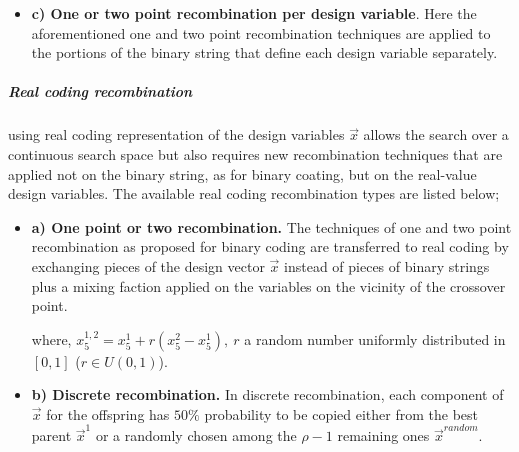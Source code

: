 \begin{itemize}
\item[]{\bf c) One or two point recombination per design variable}. Here the aforementioned one and two point recombination techniques are applied to the portions of the binary string that define each design variable separately.  
\end{itemize}
  

\subparagraph{Real coding recombination} using real coding representation of the design variables $\vec{x}$ allows the search over a continuous search space but also requires new recombination techniques that are applied not on the binary string, as for binary coating, but on the real-value design variables. The available real coding recombination types are listed below;  

\begin{itemize}
\item[]{\bf a) One point or two recombination.} The techniques of one and two point recombination as proposed for binary coding are transferred to real coding by exchanging  pieces of the design vector $\vec{x}$ instead of pieces of binary strings plus a mixing faction applied on the variables on the vicinity of the crossover point.

\begin{figure}[h!]
\begin{minipage}[b]{1.0\linewidth}
 \centering
\end{minipage}
\label{onepX}
\end{figure}
where, $x_5^{1,2}=x_5^{1}+r(x_5^{2}-x_5^{1}),~ r$ a random number uniformly distributed in $[0,1]$ ($r \in U(0,1)$).    
    
\item[]{\bf b) Discrete recombination.} In discrete recombination, each component of $\vec{x}$ for the offspring has $50\%$ probability to be copied either from the best parent $\vec{x}^1$ or a randomly chosen among the $\rho-1$ remaining ones $\vec{x}^{random}$. 


\end{itemize}
